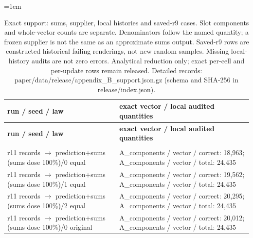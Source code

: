 \begingroup\fontsize{8}{9.5}\selectfont\setlength{\tabcolsep}{3pt}\emergencystretch=1em
\begin{longtable}{@{}>{\raggedright\arraybackslash}p{1.800in}>{\raggedright\arraybackslash}p{4.200in}@{}}
\caption{Exact support: sums, supplier, local histories and saved-r9 cases. Slot components and whole-vector counts are separate. Denominators follow the named quantity; a frozen supplier is not the same as an approximate sums output. Saved-r9 rows are constructed historical failing renderings, not new random samples. Missing local-history audits are not zero errors. Analytical reduction only; exact per-cell and per-update rows remain released. Detailed records: paper/\allowbreak{}data/\allowbreak{}release/\allowbreak{}appendix\_\allowbreak{}B\_\allowbreak{}support.json.gz (schema and SHA-256 in release/\allowbreak{}index.json).}\label{tab:appendix_B_support}\\
\toprule
\textbf{run /\allowbreak{} seed /\allowbreak{} law} & \textbf{exact vector /\allowbreak{} local audited quantities} \\
\midrule\endfirsthead
\toprule
\textbf{run /\allowbreak{} seed /\allowbreak{} law} & \textbf{exact vector /\allowbreak{} local audited quantities} \\
\midrule\endhead
\midrule\multicolumn{2}{r}{Continued on next page}\\\endfoot
\bottomrule\endlastfoot
r11 records $\to$ prediction+sums (sums dose 100\%)/\allowbreak{}0 equal & A\_\allowbreak{}components /\allowbreak{} vector /\allowbreak{} correct: 18,963; A\_\allowbreak{}components /\allowbreak{} vector /\allowbreak{} total: 24,435 \\
r11 records $\to$ prediction+sums (sums dose 100\%)/\allowbreak{}1 equal & A\_\allowbreak{}components /\allowbreak{} vector /\allowbreak{} correct: 19,562; A\_\allowbreak{}components /\allowbreak{} vector /\allowbreak{} total: 24,435 \\
r11 records $\to$ prediction+sums (sums dose 100\%)/\allowbreak{}2 equal & A\_\allowbreak{}components /\allowbreak{} vector /\allowbreak{} correct: 20,295; A\_\allowbreak{}components /\allowbreak{} vector /\allowbreak{} total: 24,435 \\
r11 records $\to$ prediction+sums (sums dose 100\%)/\allowbreak{}0 original & A\_\allowbreak{}components /\allowbreak{} vector /\allowbreak{} correct: 20,012; A\_\allowbreak{}components /\allowbreak{} vector /\allowbreak{} total: 24,435 \\

\end{longtable}
